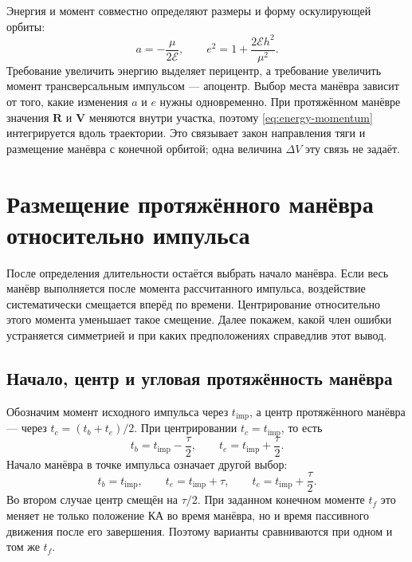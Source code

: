 \documentclass[a4paper,11pt]{article}
\newcommand{\vect}[1]{\boldsymbol{#1}}
\numberwithin{equation}{section}
\begin{document}
Энергия и момент совместно определяют размеры и форму
оскулирующей орбиты:
\[
a=-\frac{\mu}{2\mathcal E},\qquad
e^2=1+\frac{2\mathcal E h^2}{\mu^2}.
\]
Требование увеличить энергию выделяет перицентр, а требование
увеличить момент трансверсальным импульсом --- апоцентр.
Выбор места манёвра зависит от того, какие изменения $a$ и $e$
нужны одновременно. При протяжённом манёвре значения
$\vect R$ и $\vect V$ меняются внутри участка, поэтому
\eqref{eq:energy-momentum} интегрируется вдоль траектории.
Это связывает закон направления тяги и размещение манёвра
с конечной орбитой; одна величина $\Delta V$ эту связь не задаёт.

\FloatBarrier
\section{Размещение протяжённого манёвра относительно импульса}
\label{sec:placement}

После определения длительности остаётся выбрать начало манёвра.
Если весь манёвр выполняется после момента рассчитанного импульса,
воздействие систематически смещается вперёд по времени.
Центрирование относительно этого момента уменьшает такое смещение.
Далее покажем, какой член ошибки устраняется симметрией и при
каких предположениях справедлив этот вывод.

\subsection{Начало, центр и угловая протяжённость манёвра}

Обозначим момент исходного импульса через $t_{\mathrm{imp}}$,
а центр протяжённого манёвра --- через
$t_c=(t_b+t_e)/2$. При центрировании $t_c=t_{\mathrm{imp}}$, то есть
\begin{equation}
t_b=t_{\mathrm{imp}}-\frac\tau2,\qquad
t_e=t_{\mathrm{imp}}+\frac\tau2.
\label{eq:centering}
\end{equation}
Начало манёвра в точке импульса означает другой выбор:
\begin{equation}
t_b=t_{\mathrm{imp}},\qquad
t_e=t_{\mathrm{imp}}+\tau,\qquad
t_c=t_{\mathrm{imp}}+\frac\tau2.
\label{eq:start-at-impulse}
\end{equation}
Во втором случае центр смещён на $\tau/2$.
При заданном конечном моменте $t_f$ это меняет не только
положение КА во время манёвра, но и время пассивного движения
после его завершения. Поэтому варианты сравниваются
при одном и том же $t_f$.
\end{document}
